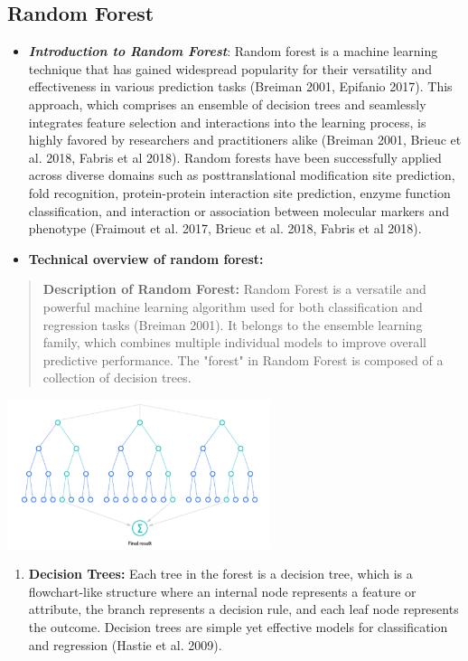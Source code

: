 \subsection{Random Forest}

\begin{itemize}
\item
  \emph{\textbf{Introduction to Random Forest}}: Random forest is a
  machine learning technique that has gained widespread popularity for
  their versatility and effectiveness in various prediction tasks
  (Breiman 2001, Epifanio 2017). This approach, which comprises an
  ensemble of decision trees and seamlessly integrates feature selection
  and interactions into the learning process, is highly favored by
  researchers and practitioners alike (Breiman 2001, Brieuc et al. 2018,
  Fabris et al 2018). Random forests have been successfully applied
  across diverse domains such as posttranslational modification site
  prediction, fold recognition, protein-protein interaction site
  prediction, enzyme function classification, and interaction or
  association between molecular markers and phenotype (Fraimout et al.
  2017, Brieuc et al. 2018, Fabris et al 2018).
\item
  \textbf{Technical overview of random forest:}
\end{itemize}

\begin{quote}
\textbf{Description of Random Forest:} Random Forest is a versatile and
powerful machine learning algorithm used for both classification and
regression tasks (Breiman 2001). It belongs to the ensemble learning
family, which combines multiple individual models to improve overall
predictive performance. The "forest" in Random Forest is composed of a
collection of decision trees.
\end{quote}

\includegraphics[width=3.02722in,height=1.71542in]{figs/rf.png}

\begin{enumerate}
\def\labelenumi{\alph{enumi}.}
\item
  \textbf{Decision Trees:} Each tree in the forest is a decision tree,
  which is a flowchart-like structure where an internal node represents
  a feature or attribute, the branch represents a decision rule, and
  each leaf node represents the outcome. Decision trees are simple yet
  effective models for classification and regression (Hastie et al.
  2009).
\end{enumerate}


